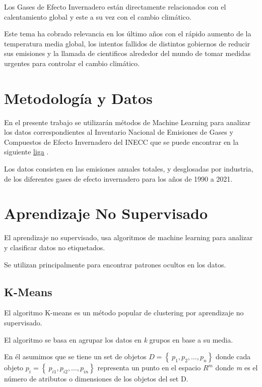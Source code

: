 \documentclass[12pt]{article}
\begin{document}
Los Gases de Efecto Invernadero están directamente relacionados con el calentamiento global y este a su vez con el cambio climático. 

Este tema ha cobrado relevancia en los último años con el rápido aumento de la temperatura media global, los intentos fallidos de distintos gobiernos de reducir sus emisiones y la llamada de cientificos alrededor del mundo de tomar medidas urgentes para controlar el cambio climático.

\section{Metodología y Datos} %

En el presente trabajo se utilizarán métodos de Machine Learning para analizar los datos correspondientes al Inventario Nacional de Emisiones de Gases y Compuestos de Efecto Invernadero del INECC que se puede encontrar en la siguiente \href{https://datos.gob.mx/busca/dataset/inventario-nacional-de-emisiones-de-gases-y-compuestos-de-efecto-invernadero-inegycei.}{liga} .

Los datos consisten en las emisiones anuales totales, y desglosadas por industria, de los diferentes gases de efecto invernadero para los años de 1990 a 2021.

\section{Aprendizaje No Supervisado}

El aprendizaje no supervisado, usa algoritmos de machine learning para analizar y clasificar datos no etiquetados. 

Se utilizan principalmente para encontrar patrones ocultos en los datos.

\subsection{K-Means}

El algoritmo K-means es un método popular de clustering por aprendizaje no supervisado.

El algoritmo se basa en agrupar los datos en \textit{k} grupos en base a su media.

En él asumimos que se tiene un set de objetos $D =\left\lbrace\ p_1, p_2, \ldots, p_n \right\rbrace$ donde cada objeto $p_i =\left\lbrace\ p_{i1}, p_{i2}, \ldots, p_{in} \right\rbrace$ representa un punto en el espacio $R^m$ donde \textit{m} es el número de atributos o dimensiones de los objetos del set D. 
\end{document}
